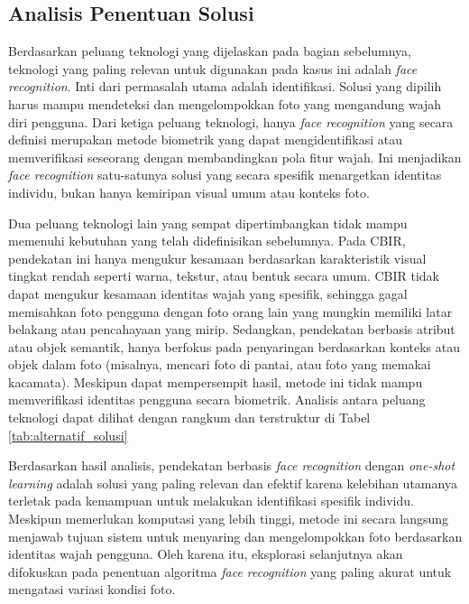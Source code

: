 \subsection{Analisis Penentuan Solusi}

Berdasarkan peluang teknologi yang dijelaskan pada bagian sebelumnya, teknologi yang paling relevan untuk digunakan pada kasus ini adalah \textit{face recognition}. Inti dari permasalah utama adalah identifikasi. Solusi yang dipilih harus mampu mendeteksi dan mengelompokkan foto yang mengandung wajah diri pengguna. Dari ketiga peluang teknologi, hanya \textit{face recognition} yang secara definisi merupakan metode biometrik yang dapat mengidentifikasi atau memverifikasi seseorang dengan membandingkan pola fitur wajah. Ini menjadikan \textit{face recognition} satu-satunya solusi yang secara spesifik menargetkan identitas individu, bukan hanya kemiripan visual umum atau konteks foto.

Dua peluang teknologi lain yang sempat dipertimbangkan tidak mampu memenuhi kebutuhan yang telah didefinisikan sebelumnya. Pada CBIR, pendekatan ini hanya mengukur kesamaan berdasarkan karakteristik visual tingkat rendah seperti warna, tekstur, atau bentuk secara umum. CBIR tidak dapat mengukur kesamaan identitas wajah yang spesifik, sehingga gagal memisahkan foto pengguna dengan foto orang lain yang mungkin memiliki latar belakang atau pencahayaan yang mirip. Sedangkan, pendekatan berbasis atribut atau objek semantik, hanya berfokus pada penyaringan berdasarkan konteks atau objek dalam foto (misalnya, mencari foto di pantai, atau foto yang memakai kacamata). Meskipun dapat mempersempit hasil, metode ini tidak mampu memverifikasi identitas pengguna secara biometrik. Analisis antara peluang teknologi dapat dilihat dengan rangkum dan terstruktur di Tabel \ref{tab:alternatif_solusi}

Berdasarkan hasil analisis, pendekatan berbasis \textit{face recognition} dengan \textit{one-shot learning} adalah solusi yang paling relevan dan efektif karena kelebihan utamanya terletak pada kemampuan untuk melakukan identifikasi spesifik individu. Meskipun memerlukan komputasi yang lebih tinggi, metode ini secara langsung menjawab tujuan sistem untuk menyaring dan mengelompokkan foto berdasarkan identitas wajah pengguna. Oleh karena itu, eksplorasi selanjutnya akan difokuskan pada penentuan algoritma \textit{face recognition} yang paling akurat untuk mengatasi variasi kondisi foto.




